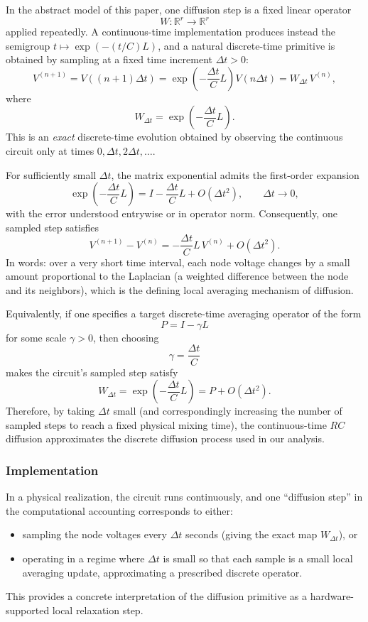 \documentclass[11pt,reqno]{article}
\numberwithin{equation}{section}
\theoremstyle{plain}
\theoremstyle{definition}
\theoremstyle{remark}
\begin{document}
In the abstract model of this paper, one diffusion step is a fixed linear operator
\[
W:\mathbb{R}^r\to\mathbb{R}^r
\]
applied repeatedly.  A continuous-time implementation produces instead the semigroup
$t\mapsto \exp(-(t/C)L)$, and a natural discrete-time primitive is obtained by sampling at
a fixed time increment $\Delta t>0$:
\begin{equation}\label{eq:W-sampling}
V^{(n+1)} = V((n+1)\Delta t)
= \exp\!\left(-\frac{\Delta t}{C}L\right) V(n\Delta t)
= W_{\Delta t}\,V^{(n)},
\end{equation}
where
\[
W_{\Delta t}=\exp\!\left(-\frac{\Delta t}{C}L\right).
\]
This is an \emph{exact} discrete-time evolution obtained by observing the continuous circuit
only at times $0,\Delta t,2\Delta t,\dots$.



For sufficiently small $\Delta t$, the matrix exponential admits the first-order expansion
\begin{equation}\label{eq:expansion}
\exp\!\left(-\frac{\Delta t}{C}L\right)
= I-\frac{\Delta t}{C}L + O(\Delta t^2),
\qquad \Delta t\to 0,
\end{equation}
with the error understood entrywise or in operator norm.
Consequently, one sampled step satisfies
\[
V^{(n+1)}-V^{(n)}
= -\frac{\Delta t}{C}L\,V^{(n)} + O(\Delta t^2).
\]
In words: over a very short time interval, each node voltage changes by a small amount
proportional to the Laplacian (a weighted difference between the node and its neighbors),
which is the defining local averaging mechanism of diffusion.

Equivalently, if one specifies a target discrete-time averaging operator of the form
\[
P = I-\gamma L
\]
for some scale $\gamma>0$, then choosing
\[
\gamma=\frac{\Delta t}{C}
\]
makes the circuit's sampled step satisfy
\[
W_{\Delta t}=\exp\!\left(-\frac{\Delta t}{C}L\right)=P+O(\Delta t^2).
\]
Therefore, by taking $\Delta t$ small (and correspondingly increasing the number of sampled
steps to reach a fixed physical mixing time), the continuous-time $RC$ diffusion approximates
the discrete diffusion process used in our analysis.

\subsubsection*{Implementation}
In a physical realization, the circuit runs continuously, and one ``diffusion step'' in the
computational accounting corresponds to either:
\begin{itemize}
\item sampling the node voltages every $\Delta t$ seconds (giving the exact map $W_{\Delta t}$), or
\item operating in a regime where $\Delta t$ is small so that each sample is a small local
averaging update, approximating a prescribed discrete operator.
\end{itemize}
This provides a concrete interpretation of the diffusion primitive as a hardware-supported
local relaxation step.
\end{document}
